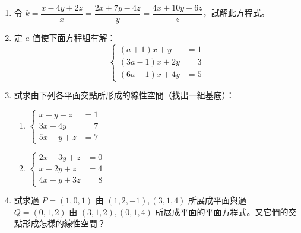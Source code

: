 \begin{enumerate}[label=\arabic*., leftmargin=2em]
  \item 令 $k = \dfrac{x-4y+2z}{x} = \dfrac{2x+7y-4z}{y} = \dfrac{4x+10y-6z}{z}$，試解此方程式。

  \item 定 $a$ 值使下面方程組有解：
  \[ \left\{\begin{aligned}
  (a+1)x + y &= 1 \\
  (3a-1)x + 2y &= 3 \\
  (6a-1)x + 4y &= 5
  \end{aligned}\right. \]

  \item[\textbf{*5.}] 試求由下列各平面交點所形成的線性空間（找出一組基底）：
  \begin{enumerate}[label=(\roman*)]
    \item $\left\{\begin{aligned}
    x+y-z &= 1 \\
    3x+4y &= 7 \\
    5x+y+z &= 7
    \end{aligned}\right.$
    \item $\left\{\begin{aligned}
    2x+3y+z &= 0 \\
    x-2y+z &= 4 \\
    4x-y+3z &= 8
    \end{aligned}\right.$
  \end{enumerate}

  \item[\textbf{*6.}] 試求過 $P=(1, 0, 1)$ 由 $(1, 2, -1), (3, 1, 4)$ 所展成平面與過 $Q=(0, 1, 2)$ 由 $(3, 1, 2), (0, 1, 4)$ 所展成平面的平面方程式。又它們的交點形成怎樣的線性空間？


\end{enumerate}
